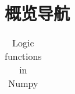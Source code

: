 \chapter{概览导航}
\begin{table}
    \centering
    \caption{Logic functions in Numpy}
    \label{tab1}
    \begin{tabular}{ll}
        \hline
        \nameref{np.allclose} & \\
        \hline
    \end{tabular}
\end{table}